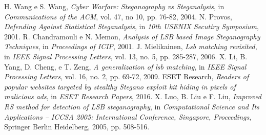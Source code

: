 \begin{thebibliography}{}
H. Wang e S. Wang, \textit{Cyber Warfare: Steganography  vs Steganalysis}, in \textit{Communications of the ACM}, vol. 47, no 10, pp. 76-82, 2004.
N. Provos, \textit{Defending Against Statistical Steganalysis}, in \textit{10th USENIX Secutiry Symposium}, 2001.
R. Chandramouli e N. Memon, \textit{Analysis of LSB based Image Steganography Techniques}, in \textit{Proceedings of ICIP}, 2001.
J. Mielikainen, \textit{Lsb matching revisited}, in \textit{IEEE Signal Processing Letters}, vol. 13, no. 5, pp. 285-287,
2006.
X. Li, B. Yang, D. Cheng, e T. Zeng, \textit{A generalization of lsb matching}, in \textit{IEEE Signal Processing
Letters}, vol. 16, no. 2, pp. 69-72, 2009.
ESET Research, \textit{Readers of popular websites targeted by stealthy Stegano exploit kit hiding in pixels of malicious ads}, in \textit{ESET Research Papers}, 2016.
X. Luo, B. Liu e F. Liu, \textit{Improved RS method for detection of LSB steganography}, in \textit{Computational Science and Its Applications -- ICCSA 2005: International Conference, Singapore, Proceedings}, Springer Berlin Heidelberg, 2005, pp. 508-516.
\end{thebibliography}